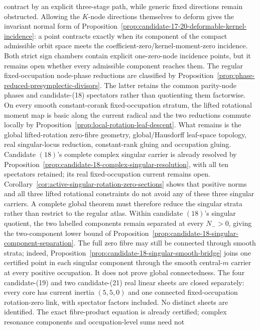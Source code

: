 \documentclass[11pt]{article}
\theoremstyle{definition}
\theoremstyle{remark}
\begin{document}
contract by an explicit three-stage path, while generic fixed directions
remain obstructed.  Allowing the \(K\)-node directions themselves to deform
gives the invariant normal form of
Proposition~\ref{prop:candidate-17-20-deformable-kernel-incidence}: a point
contracts exactly when its component of the compact admissible orbit space
meets the coefficient-zero/kernel-moment-zero incidence.  Both strict sign
chambers contain explicit one-zero-node incidence points, but it remains
open whether every admissible component reaches them.  The
regular fixed-occupation node-phase reductions are classified by
Proposition~\ref{prop:phase-reduced-presymplectic-divisors}.  The latter
retains the common parity-node phases and candidate-(18) spectators rather
than quotienting them factorwise.  On every smooth constant-corank
fixed-occupation stratum, the lifted rotational moment map is basic along
the current radical and the two reductions commute locally by
Proposition~\ref{prop:local-rotation-leaf-descent}.  What remains is the
global lifted-rotation zero-fibre geometry, global/Hausdorff leaf-space
topology, real singular-locus reduction, constant-rank gluing and occupation
gluing.  Candidate \((18)\)'s complete complex singular carrier is already
resolved by Proposition~\ref{prop:candidate-18-complex-singular-resolution},
with all ten spectators retained; its real fixed-occupation current remains
open.  Corollary~\ref{cor:active-singular-rotation-zero-sections} shows that
positive norms and all three lifted rotational constraints do not avoid any
of these three singular carriers.  A complete global theorem must therefore
reduce the singular strata rather than restrict to the regular atlas.
Within candidate \((18)\)'s singular quotient, the two labelled components
remain separated at every \(N_->0\), giving the two-component lower bound of
Proposition~\ref{prop:candidate-18-singular-component-separation}.  The full
zero fibre may still be connected through smooth strata; indeed,
Proposition~\ref{prop:candidate-18-singular-smooth-bridge} joins one certified
point in each singular component through the smooth central-\(m\) carrier at
every positive occupation.  It does not prove global connectedness.  The four
candidate-(19) and two candidate-(21) real linear sheets
are closed
separately: every core has current inertia \((5,5,0)\) and one connected
fixed-occupation rotation-zero link, with spectator factors included.  No
distinct sheets are identified.  The exact fibre-product equation is already
certified; complex resonance components and occupation-level sums need not
\end{document}
